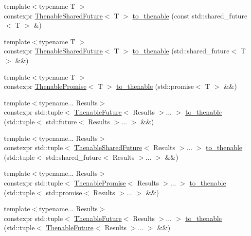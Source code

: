 \begin{DoxyCompactItemize}
\item 
{\footnotesize template$<$typename T $>$ }\\constexpr \hyperlink{classthenable_1_1_thenable_shared_future}{Thenable\+Shared\+Future}$<$ T $>$ \hyperlink{namespacethenable_aae28a1f0e9368b6aedfee55957e0c772}{to\+\_\+thenable} (const std\+::shared\+\_\+future$<$ T $>$ \&)
\item 
{\footnotesize template$<$typename T $>$ }\\constexpr \hyperlink{classthenable_1_1_thenable_shared_future}{Thenable\+Shared\+Future}$<$ T $>$ \hyperlink{namespacethenable_a9b8be419c3f5f5420a48bd68ea458f15}{to\+\_\+thenable} (std\+::shared\+\_\+future$<$ T $>$ \&\&)
\item 
{\footnotesize template$<$typename T $>$ }\\constexpr \hyperlink{classthenable_1_1_thenable_promise}{Thenable\+Promise}$<$ T $>$ \hyperlink{namespacethenable_a6e1e0d7d9fee302429067e4a1f7c2436}{to\+\_\+thenable} (std\+::promise$<$ T $>$ \&\&)
\item 
{\footnotesize template$<$typename... Results$>$ }\\constexpr std\+::tuple$<$ \hyperlink{classthenable_1_1_thenable_future}{Thenable\+Future}$<$ Results $>$... $>$ \hyperlink{namespacethenable_a9337c975d6426aaf9f76ad790c3b3a93}{to\+\_\+thenable} (std\+::tuple$<$ std\+::future$<$ Results $>$... $>$ \&\&)
\item 
{\footnotesize template$<$typename... Results$>$ }\\constexpr std\+::tuple$<$ \hyperlink{classthenable_1_1_thenable_shared_future}{Thenable\+Shared\+Future}$<$ Results $>$... $>$ \hyperlink{namespacethenable_a444ece5332d86fa1ded34452ffca0767}{to\+\_\+thenable} (std\+::tuple$<$ std\+::shared\+\_\+future$<$ Results $>$... $>$ \&\&)
\item 
{\footnotesize template$<$typename... Results$>$ }\\constexpr std\+::tuple$<$ \hyperlink{classthenable_1_1_thenable_promise}{Thenable\+Promise}$<$ Results $>$... $>$ \hyperlink{namespacethenable_a18e0e6c5b9a65bad51fb4351ef7bc587}{to\+\_\+thenable} (std\+::tuple$<$ std\+::promise$<$ Results $>$... $>$ \&\&)
\item 
{\footnotesize template$<$typename... Results$>$ }\\constexpr std\+::tuple$<$ \hyperlink{classthenable_1_1_thenable_future}{Thenable\+Future}$<$ Results $>$... $>$ \hyperlink{namespacethenable_a22cec8f52b9c37845ae5ae733898a106}{to\+\_\+thenable} (std\+::tuple$<$ \hyperlink{classthenable_1_1_thenable_future}{Thenable\+Future}$<$ Results $>$... $>$ \&\&)

\end{DoxyCompactItemize}
